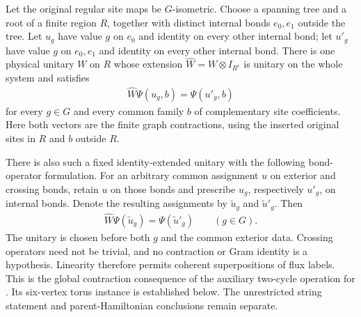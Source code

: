 \begin{lemma}%
    \label{thm:peps_regular_two_cycle_global_flux_move}
    \leanok
    Let the original regular site maps be $G$-isometric. Choose a spanning
    tree and a root of a finite region $R$, together with distinct internal
    bonds $e_0,e_1$ outside the tree. Let $u_g$ have value $g$ on $e_0$ and
    identity on every other internal bond; let $u'_g$ have value $g$ on
    $e_0,e_1$ and identity on every other internal bond.
    There is one physical unitary $W$ on $R$ whose extension
    $\widehat W=W\otimes I_{R^c}$ is unitary on the whole system and satisfies
    \begin{align}
        \widehat W\Psi(u_g,b)=\Psi(u'_g,b)
    \end{align}
    for every $g\in G$ and every common family $b$ of complementary site
    coefficients. Here both vectors are the finite graph contractions,
    using the inserted original sites in $R$ and $b$ outside $R$.

    There is also such a fixed identity-extended unitary with the following
    bond-operator formulation. For an arbitrary common assignment $u$ on
    exterior and crossing bonds, retain $u$ on those bonds and prescribe
    $u_g$, respectively $u'_g$, on internal bonds. Denote the resulting
    assignments by $\widetilde u_g$ and $\widetilde u'_g$. Then
    \begin{align}
        \widehat W\Psi(\widetilde u_g)
        =\Psi(\widetilde u'_g)
        \qquad (g\in G).
    \end{align}
    The unitary is chosen before both $g$ and the common exterior data.
    Crossing operators need not be trivial, and no contraction or Gram
    identity is a hypothesis. Linearity therefore permits coherent
    superpositions of flux labels.
    This is the global contraction consequence of the auxiliary two-cycle
    operation for \cite[Theorem~6.16]{Schuch2010PEPS}. Its six-vertex torus
    instance is established below. The unrestricted string statement and
    parent-Hamiltonian conclusions remain separate.
\end{lemma}


